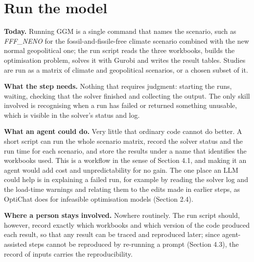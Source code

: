 \section{Run the model}

\textbf{Today.} Running GGM is a single command that names the scenario, such as \emph{FFF\_NENO} for the fossil-and-fissile-free climate scenario combined with the new normal geopolitical one; the run script reads the three workbooks, builds the optimisation problem, solves it with Gurobi and writes the result tables.
Studies are run as a matrix of climate and geopolitical scenarios, or a chosen subset of it.

\textbf{What the step needs.} Nothing that requires judgment: starting the runs, waiting, checking that the solver finished and collecting the output.
The only skill involved is recognising when a run has failed or returned something unusable, which is visible in the solver's status and log.

\textbf{What an agent could do.} Very little that ordinary code cannot do better.
A short script can run the whole scenario matrix, record the solver status and the run time for each scenario, and store the results under a name that identifies the workbooks used.
This is a workflow in the sense of Section 4.1, and making it an agent would add cost and unpredictability for no gain.
The one place an LLM could help is in explaining a failed run, for example by reading the solver log and the load-time warnings and relating them to the edits made in earlier steps, as OptiChat does for infeasible optimisation models (Section 2.4).

\textbf{Where a person stays involved.} Nowhere routinely.
The run script should, however, record exactly which workbooks and which version of the code produced each result, so that any result can be traced and reproduced later; since agent-assisted steps cannot be reproduced by re-running a prompt (Section 4.3), the record of inputs carries the reproducibility.
